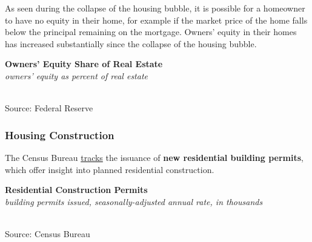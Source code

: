 \documentclass{report}
\makeatletter
\newcommand{\tbllink}[1]{\href{https://raw.githubusercontent.com/bdecon/US-chartbook/master/chartbook/data/#1}{\faTable}}
\newcommand*\short[1]{\expandafter\@gobbletwo\number\numexpr#1\relax}
\newcommand{\dateaxisticks}{
		date coordinates in=x, axis line style={draw=none},
		xmax={2023-02-15},
		max space between ticks=40,	    
		xtick={{1990-01-01}, {1992-01-01}, {1994-01-01}, 
			{1996-01-01}, {1998-01-01}, {2000-01-01}, 
			{2002-01-01}, {2004-01-01}, {2006-01-01},
			{2008-01-01}, {2010-01-01}, {2012-01-01}, {2014-01-01},
		    {2016-01-01}, {2018-01-01}, {2020-01-01}, {2022-01-01}, 
		    {2024-01-01}, {2026-01-01}},
		minor xtick={{1989-01-01}, {1991-01-01}, {1993-01-01},
			{1995-01-01}, {1997-01-01}, {1999-01-01}, 
			{2001-01-01}, {2003-01-01}, {2005-01-01}, {2007-01-01},
		    {2009-01-01}, {2011-01-01}, {2013-01-01}, {2015-01-01},
		    {2017-01-01}, {2019-01-01}, {2021-01-01}, {2023-01-01}, 
		    {2025-01-01}, {2027-01-01}},
		enlarge y limits={0.06}, enlarge x limits={0.01},
		}
\newcommand{\shdateaxisticks}{
		date coordinates in=x, axis line style={draw=none},
		xmax={2023-02-15},
		max space between ticks=40,	    
		xtick={{1990-01-01}, {1995-01-01}, {2000-01-01}, 
			{2005-01-01}, {2010-01-01}, {2015-01-01}, {2020-01-01}},
		minor xtick={},
		enlarge y limits={0.06}, enlarge x limits={0.01},
		}
\newcommand{\bbar}[2]{extra #1 ticks = {{#2}}, extra #1 tick labels = ,
		extra #1 tick style = {grid=major, grid style={thick, black!25}},}
\newcommand{\stdline}[4]{\addplot[very thick, no markers, color=#1] 
		table [x=#2, y=#3, col sep=comma] {#4};	}
\newcommand{\rbars}{
		\fill[color=black!10] (axis cs:{1990-07-01},\pgfkeysvalueof{/pgfplots/ymin}) rectangle 
			(axis cs:{1991-03-01}, \pgfkeysvalueof{/pgfplots/ymax});
		\fill[color=black!10] (axis cs:{2007-12-01},\pgfkeysvalueof{/pgfplots/ymin}) rectangle 
			(axis cs:{2009-07-01}, \pgfkeysvalueof{/pgfplots/ymax});
		\fill[color=black!10] (axis cs:{2001-03-01},\pgfkeysvalueof{/pgfplots/ymin}) rectangle 
			(axis cs:{2001-11-01}, \pgfkeysvalueof{/pgfplots/ymax});
		\fill[color=black!10] (axis cs:{2020-02-01},\pgfkeysvalueof{/pgfplots/ymin}) rectangle 
			(axis cs:{2020-05-01}, \pgfkeysvalueof{/pgfplots/ymax});}
\makeatother
\begin{document}
{\begin{minipage}{0.76\textwidth}
As seen during the collapse of the housing bubble, it is possible for a homeowner to have no equity in their home, for example if the market price of the home falls below the principal remaining on the mortgage. Owners' equity in their homes has increased substantially since the collapse of the housing bubble. 
\end{minipage}
\vspace{1mm}

\begin{minipage}{0.31\textwidth}
\small 
\end{minipage}\hspace{7mm}
\begin{minipage}{0.41\textwidth}
\normalsize \textbf{Owners' Equity Share of Real Estate}\\
\footnotesize{\textit{owners' equity as percent of real estate}}\\
\hspace*{-2mm} \\
\footnotesize{Source: Federal Reserve} \hspace{30mm} \tbllink{homeeq.csv} 

\end{minipage}
\newpage
\begin{minipage}{0.76\textwidth}
\subsubsection*{Housing Construction}
\small The Census Bureau \href{https://www.census.gov/construction/bps/}{tracks} the issuance of \textbf{new residential building permits}, which offer insight into planned residential construction. 
\vspace{1mm}

\normalsize{\textbf{Residential Construction Permits}}\\
\footnotesize{\textit{building permits issued, seasonally-adjusted annual rate, in thousands}}\\
\hspace*{-2mm} \\
\footnotesize{Source: Census Bureau} \hfill \tbllink{permits_total.csv}
\vspace{2mm}


\end{minipage}}
\end{document}
